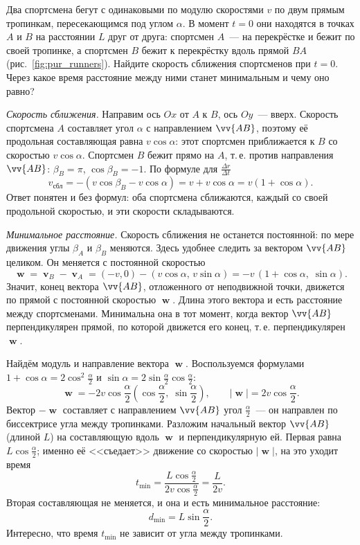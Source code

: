 \documentclass[../main.tex]{subfiles}
\begin{document}
\begin{example}
Два спортсмена бегут с одинаковыми по модулю скоростями $v$ по двум прямым
тропинкам, пересекающимся под углом $\alpha$. В момент $t = 0$ они находятся в
точках $A$ и $B$ на расстоянии $L$ друг от друга: спортсмен $A$~--- на перекрёстке
и бежит по своей тропинке, а спортсмен $B$ бежит к перекрёстку вдоль прямой $BA$
(рис.~\ref{fig:pur_runners}). Найдите скорость сближения спортсменов при $t = 0$.
Через какое время расстояние между ними станет минимальным и чему оно равно?


\noindent\textit{Скорость сближения.} Направим ось $Ox$ от $A$ к $B$, ось $Oy$~---
вверх. Скорость спортсмена $A$ составляет угол $\alpha$ с направлением $\vv{AB}$,
поэтому её продольная составляющая равна $v\cos\alpha$: этот спортсмен приближается
к $B$ со скоростью $v\cos\alpha$. Спортсмен $B$ бежит прямо на $A$, т.\,е. против
направления $\vv{AB}$: $\beta_B = \pi$, $\cos\beta_B = -1$. По формуле для
$\frac{\Delta r}{\Delta t}$
\[
v_{\text{сбл}} = -(v\cos\beta_B - v\cos\alpha) = v + v\cos\alpha = v(1 + \cos\alpha).
\]
Ответ понятен и без формул: оба спортсмена сближаются, каждый со своей продольной
скоростью, и эти скорости складываются.

\noindent\textit{Минимальное расстояние.} Скорость сближения не останется
постоянной: по мере движения углы $\beta_A$ и $\beta_B$ меняются. Здесь удобнее
следить за вектором $\vv{AB}$ целиком. Он меняется с постоянной скоростью
\[
\mbfw = \mbfv_B - \mbfv_A = (-v, 0) - (v\cos\alpha,\, v\sin\alpha)
= -v\,(1 + \cos\alpha,\; \sin\alpha).
\]
Значит, конец вектора $\vv{AB}$, отложенного от неподвижной точки, движется по
прямой с постоянной скоростью $\mbfw$. Длина этого вектора и есть расстояние между
спортсменами. Минимальна она в тот момент, когда вектор $\vv{AB}$ перпендикулярен
прямой, по которой движется его конец, т.\,е. перпендикулярен~$\mbfw$.

Найдём модуль и направление вектора $\mbfw$. Воспользуемся формулами
$1 + \cos\alpha = 2\cos^2\frac{\alpha}{2}$ и $\sin\alpha =
2\sin\frac{\alpha}{2}\cos\frac{\alpha}{2}$:
\[
\mbfw = -2v\cos\frac{\alpha}{2}\left(\cos\frac{\alpha}{2},\; \sin\frac{\alpha}{2}\right),
\qquad
|\mbfw| = 2v\cos\frac{\alpha}{2}.
\]
Вектор $-\mbfw$ составляет с направлением $\vv{AB}$ угол $\frac{\alpha}{2}$~--- он
направлен по биссектрисе угла между тропинками. Разложим начальный вектор
$\vv{AB}$ (длиной $L$) на составляющую вдоль $\mbfw$ и перпендикулярную ей. Первая
равна $L\cos\frac{\alpha}{2}$; именно её <<съедает>> движение со скоростью $|\mbfw|$,
на это уходит время
\[
t_{\min} = \frac{L\cos\frac{\alpha}{2}}{2v\cos\frac{\alpha}{2}} = \frac{L}{2v}.
\]
Вторая составляющая не меняется, и она и есть минимальное расстояние:
\[
d_{\min} = L\sin\frac{\alpha}{2}.
\]
Интересно, что время $t_{\min}$ не зависит от угла между тропинками.
\end{example}
\end{document}
